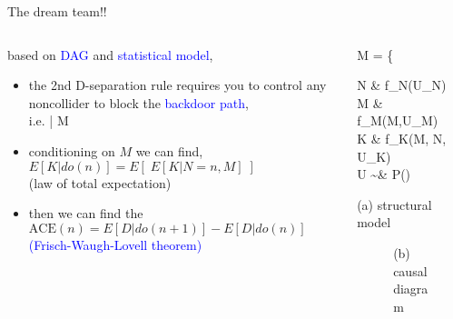 %
%
\begin{frame}
	{The dream team!!}
	\begin{columns}
		\begin{column}{0.5\textwidth}
			based on \textcolor{blue}{DAG} and \textcolor{blue}{statistical model},
			\begin{itemize}
				\item the 2nd D-separation rule requires you to control any noncollider to block the \textcolor{blue}{backdoor path}, \\
				i.e.  \; | M \\
				\item conditioning on $M$ we can find, \\
				{\small $E[K | do(n)] = E[\; E[K | N=n, M] \;]$} \\
				{\small (law of total expectation)}
				\item then we can find the \\
				{\small $\text{ACE}(n) = E[D | do(n+1)] - E[D | do(n)]$ } \\
				{\small \textcolor{blue}{(Frisch-Waugh-Lovell theorem)} }
			\end{itemize}
		\end{column}
		\begin{column}{0.5\textwidth}  
			\begin{equ}
				M = \left\{ \begin{aligned} 
					N \leftarrow & \; f_{N}(U_{N}) \\
					M \leftarrow & \; f_{M}(M,U_{M}) \\
					K \leftarrow & \; f_{K}(M, N, U_{K}) \\
					U \sim & \; P()
				\end{aligned} \right
				\caption*{(a) structural model}
			\end{equ}
			\begin{figure}
				\caption*{(b) causal diagram}
			\end{figure}
		\end{column}
	\end{columns}
\end{frame}
